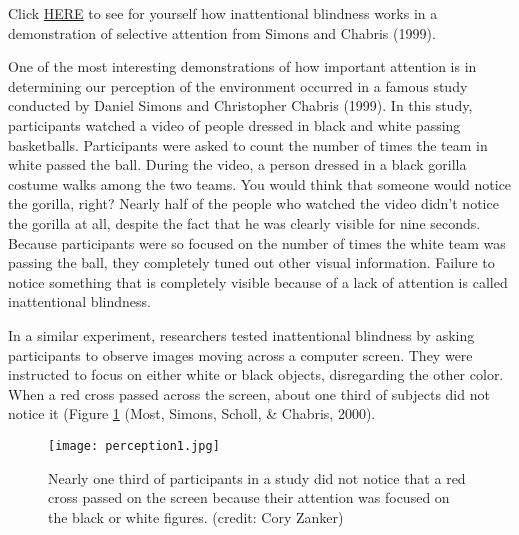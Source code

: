 \begin{corollary}
Click \href{https://www.youtube.com/watch?v=vJG698U2Mvo}{HERE} to see for yourself how inattentional blindness works in a demonstration of selective attention from Simons and Chabris (1999). 
\end{corollary}

One of the most interesting demonstrations of how important attention is in determining our perception of the environment occurred in a famous study conducted by Daniel Simons and Christopher Chabris (1999). In this study, participants watched a video of people dressed in black and white passing basketballs. Participants were asked to count the number of times the team in white passed the ball. During the video, a person dressed in a black gorilla costume walks among the two teams. You would think that someone would notice the gorilla, right? Nearly half of the people who watched the video didn’t notice the gorilla at all, despite the fact that he was clearly visible for nine seconds. Because participants were so focused on the number of times the white team was passing the ball, they completely tuned out other visual information. Failure to notice something that is completely visible because of a lack of attention is called inattentional blindness.

In a similar experiment, researchers tested inattentional blindness by asking participants to observe images moving across a computer screen. They were instructed to focus on either white or black objects, disregarding the other color. When a red cross passed across the screen, about one third of subjects did not notice it (Figure \ref{fig:perception1} (Most, Simons, Scholl, \& Chabris, 2000).

\begin{figure}[ht]
\centering\texttt{[image: perception1.jpg]}
\caption{Nearly one third of participants in a study did not notice that a red cross passed on the screen because their attention was focused on the black or white figures. (credit: Cory Zanker)}
\label{fig:perception1} %
\end{figure}

